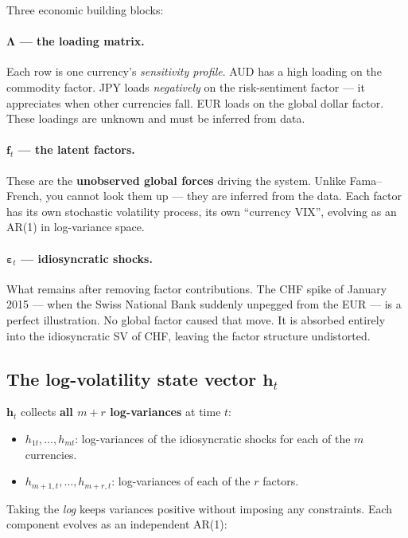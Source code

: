 \documentclass[11pt, a4paper]{article}\usepackage[]{graphicx}\usepackage[]{xcolor}
\newcommand{\stress}[1]{\textbf{#1}}
\newcommand{\term}[1]{\textit{#1}}
\begin{document}
Three economic building blocks:

\paragraph{$\boldsymbol{\Lambda}$ --- the loading matrix.}
Each row is one currency's \term{sensitivity profile}.  AUD has a high loading
on the commodity factor.  JPY loads \textit{negatively} on the risk-sentiment
factor --- it appreciates when other currencies fall.  EUR loads on the global
dollar factor.  These loadings are unknown and must be inferred from data.

\paragraph{$\mathbf{f}_t$ --- the latent factors.}
These are the \stress{unobserved global forces} driving the system.  Unlike
Fama--French, you cannot look them up --- they are inferred from the data.
Each factor has its own stochastic volatility process, its own ``currency
VIX'', evolving as an AR(1) in log-variance space.

\paragraph{$\boldsymbol{\varepsilon}_t$ --- idiosyncratic shocks.}
What remains after removing factor contributions.  The CHF spike of January
2015 --- when the Swiss National Bank suddenly unpegged from the EUR --- is a
perfect illustration.  No global factor caused that move.  It is absorbed
entirely into the idiosyncratic SV of CHF, leaving the factor structure
undistorted.

\subsection{The log-volatility state vector $\mathbf{h}_t$}

$\mathbf{h}_t$ collects \stress{all $m + r$ log-variances} at time $t$:
\begin{itemize}[itemsep=2pt]
  \item $h_{1t}, \ldots, h_{mt}$: log-variances of the idiosyncratic shocks
        for each of the $m$ currencies.
  \item $h_{m+1,t}, \ldots, h_{m+r,t}$: log-variances of each of the $r$
        factors.
\end{itemize}

Taking the \textit{log} keeps variances positive without imposing any
constraints.  Each component evolves as an independent AR(1):
\end{document}
